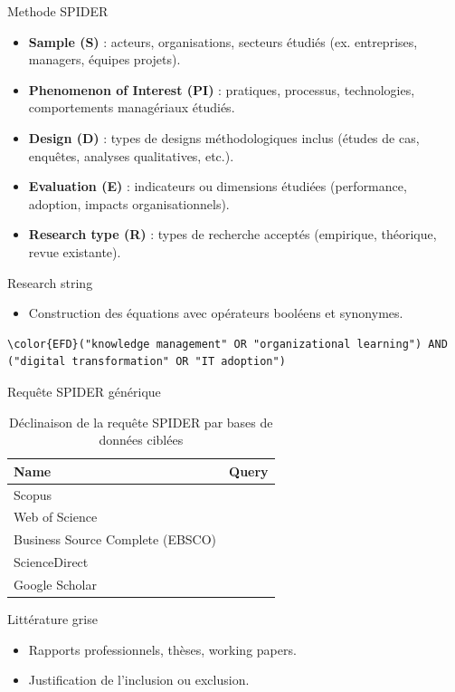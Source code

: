 \documentclass[a4paper,12pt]{article}
\begin{document}
Methode SPIDER
\begin{itemize}
\item \textbf{\textbf{Sample (S)}} : acteurs, organisations, secteurs étudiés (ex. entreprises, managers, équipes projets).
\item \textbf{\textbf{Phenomenon of Interest (PI)}} : pratiques, processus, technologies, comportements managériaux étudiés.
\item \textbf{\textbf{Design (D)}} : types de designs méthodologiques inclus (études de cas, enquêtes, analyses qualitatives, etc.).
\item \textbf{\textbf{Evaluation (E)}} : indicateurs ou dimensions étudiées (performance, adoption, impacts organisationnels).
\item \textbf{\textbf{Research type (R)}} : types de recherche acceptés (empirique, théorique, revue existante).
\end{itemize}

Research string
\begin{itemize}
\item Construction des équations avec opérateurs booléens et synonymes.
\end{itemize}

\begin{listing}[htbp]
\begin{Code}
\begin{Verbatim}
\color{EFD}("knowledge management" OR "organizational learning") AND ("digital transformation" OR "IT adoption")
\end{Verbatim}
\end{Code}
\caption{Requête SPIDER générique}
\end{listing}

\begin{table}[htbp]
\caption{Déclinaison de la requête SPIDER par bases de données ciblées}
\centering
\begin{tabular}{ll}
Name & Query\\
\hline
Scopus & \\
Web of Science & \\
Business Source Complete (EBSCO) & \\
ScienceDirect & \\
Google Scholar & \\
\end{tabular}
\end{table}

Littérature grise
\begin{itemize}
\item Rapports professionnels, thèses, working papers.
\item Justification de l’inclusion ou exclusion.
\end{itemize}
\end{document}
